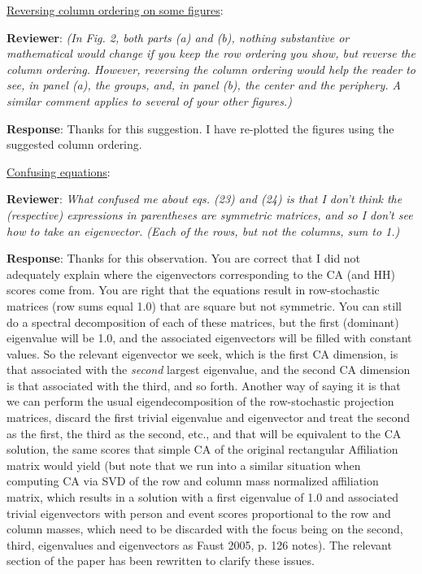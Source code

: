 \documentclass{article}
\begin{document}
\underline{Reversing column ordering on some figures}:

\textbf{Reviewer}: \textit{(In Fig. 2, both parts (a) and (b), nothing substantive or mathematical would change if you keep the row ordering you show, but reverse the column ordering. However, reversing the column ordering would help the reader to see, in panel (a), the groups, and, in panel (b), the center and the periphery. A similar comment applies to several of your other figures.)}

\textbf{Response}: Thanks for this suggestion. I have re-plotted the figures using the suggested column ordering. 

\underline{Confusing equations}:

\textbf{Reviewer}: \textit{What confused me about eqs. (23) and (24) is that I don't think the (respective) expressions in parentheses are symmetric matrices, and so I don't see how to take an eigenvector. (Each of the rows, but not the columns, sum to 1.)}

\textbf{Response}: Thanks for this observation. You are correct that I did not adequately explain where the eigenvectors corresponding to the CA (and HH) scores come from. You are right that the equations result in row-stochastic matrices (row sums equal 1.0) that are square but not symmetric. You can still do a spectral decomposition of each of these matrices, but the first (dominant) eigenvalue will be 1.0, and the associated eigenvectors will be filled with constant values. So the relevant eigenvector we seek, which is the first CA dimension, is that associated with the \textit{second} largest eigenvalue, and the second CA dimension is that associated with the third, and so forth. Another way of saying it is that we can perform the usual eigendecomposition of the row-stochastic projection matrices, discard the first trivial eigenvalue and eigenvector and treat the second as the first, the third as the second, etc., and that will be equivalent to the CA solution, the same scores that simple CA of the original rectangular Affiliation matrix would yield (but note that we run into a similar situation when computing CA via SVD of the row and column mass normalized affiliation matrix, which results in a solution with a first eigenvalue of 1.0 and associated trivial eigenvectors with person and event scores proportional to the row and column masses, which need to be discarded with the focus being on the second, third, eigenvalues and eigenvectors as Faust 2005, p. 126 notes). The relevant section of the paper has been rewritten to clarify these issues. 
\end{document}
